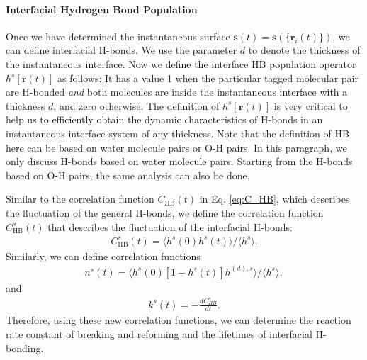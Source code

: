 {\FloatBarrier
\paragraph{Interfacial Hydrogen Bond Population} \label{IHBP}
Once we have determined the instantaneous surface ${\mathbf s}(t)={\mathbf s}(\{{\mathbf r}_i(t)\})$, we can define interfacial H-bonds.
We use the parameter $d$ to denote the thickness of the instantaneous interface.
Now we define the interface HB population operator $h^{s}[{\mathbf r}(t)]$ as follows:
It has a value 1 when the particular tagged molecular pair are H-bonded \emph{and} both molecules are inside the instantaneous interface 
with a thickness $d$, and zero otherwise. 
The definition of  $h^{s}[{\mathbf r}(t)]$ is very critical to help us to efficiently obtain the dynamic characteristics of H-bonds in an
instantaneous interface system of any thickness. Note that the definition of HB here can be based on water molecule pairs or O-H pairs. 
In this paragraph, we only discuss H-bonds based on water molecule pairs. Starting from the H-bonds based on O-H pairs, the same analysis 
can also be done. 

Similar to the correlation function $C_\text{HB}(t)$ in Eq. \ref{eq:C_HB}, which describes the fluctuation of the general H-bonds,
we define the correlation function $C^s_\text{HB}(t)$ that describes the fluctuation of the interfacial H-bonds: 
\begin{eqnarray}
C^s_{\text{HB}}(t)=\langle h^s(0)h^s(t) \rangle/\langle h^s\rangle
\label{eq:C_s_HB}.
\end{eqnarray}
%
Similarly, we can define correlation functions 
\begin{eqnarray}
n^s(t)=\langle h^s(0)[1-h^s(t)]h^{(d),s} \rangle/\langle h^s\rangle
\label{eq:n_s_HB},
\end{eqnarray}
and 
\begin{eqnarray}
k^s(t)= -\frac{dC_{HB}^s}{dt}
\label{eq:k_s_HB}.
\end{eqnarray}
Therefore, using these new correlation functions, we can determine the reaction rate constant of breaking and reforming and the lifetimes of interfacial H-bonding.
%
\FloatBarrier
}
